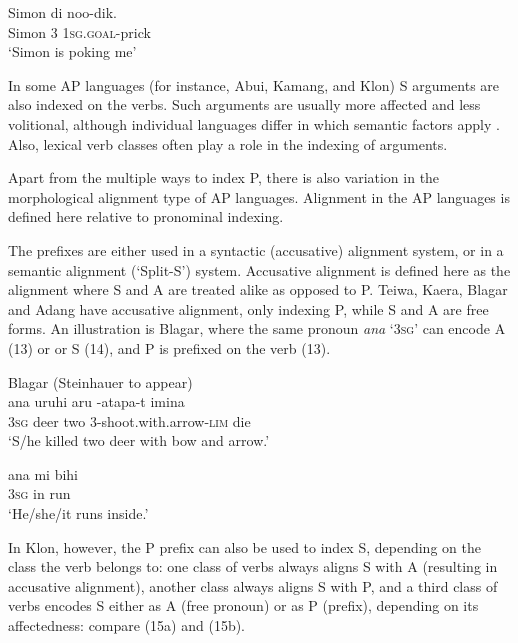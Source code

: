 \ea%
\label{ex:12}
\gll Simon   di   noo-dik. \\
 Simon   3   \textsc{1sg.goal}{}-prick  \\
\glt `Simon is poking me'
\z





In some AP languages (for instance, Abui, Kamang, and Klon) S arguments are also indexed on the verbs. Such arguments are usually more affected and less volitional, although individual languages differ in which semantic factors apply \citep{FeddenEtAlthisvolume,FeddenEtAl2014}. Also, lexical verb classes often play a role in the indexing of arguments.

Apart from the multiple ways to index P, there is also variation in the morphological alignment type of AP languages. Alignment in the AP languages is defined here relative to pronominal indexing.

The prefixes are either used in a syntactic (accusative) alignment system, or in a semantic alignment (`Split-S') system. Accusative alignment is defined here as the alignment where S and A are treated alike as opposed to P. Teiwa, Kaera, Blagar and Adang have accusative alignment, only indexing P, while S and A are free forms. An illustration is Blagar, where the same pronoun \textit{{\textglotstop}}\textit{ana} `3\textsc{sg}' can encode A (13) or or S (14), and P is prefixed on the verb (13).



\ea%
\label{ex:13}
  Blagar (Steinhauer to appear)  \\
\gll {\textglotstop}ana   uruhi{\ng}  aru {\textglotstop}-atapa-t       imina \\
 3\textsc{sg}  deer   two 3-shoot.with.arrow-\textsc{lim}  die  \\
\glt `S/he killed two deer with bow and arrow.'
\z







\ea%
\label{ex:14}
\gll {\textglotstop}ana  mi   bihi  \\
3\textsc{sg}  in  run   \\
\glt `He/she/it runs inside.'
\z







In Klon, however, the P prefix can also be used to index S, depending on the class the verb belongs to: one class of verbs always aligns S with A (resulting in accusative alignment), another class always aligns S with P, and a third class of verbs encodes S either as A (free pronoun) or as P (prefix), depending on its affectedness: compare (15a) and (15b).



